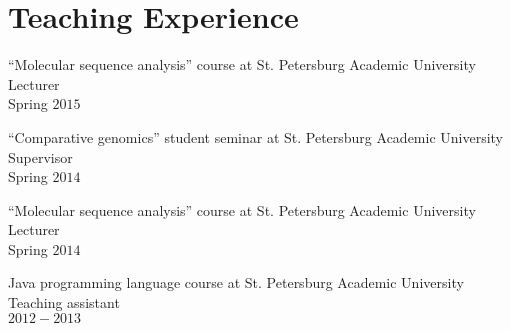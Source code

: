 \blankline

\section{Teaching Experience}
``Molecular sequence analysis'' course at St. Petersburg Academic University\\
Lecturer\\
Spring $2015$

\blankline

``Comparative genomics'' student seminar at St. Petersburg Academic University\\
Supervisor\\
Spring $2014$

\blankline

``Molecular sequence analysis'' course at St. Petersburg Academic University\\
Lecturer\\
Spring $2014$

\blankline

Java programming language course at St. Petersburg Academic University\\
Teaching assistant\\ 
$2012-2013$




